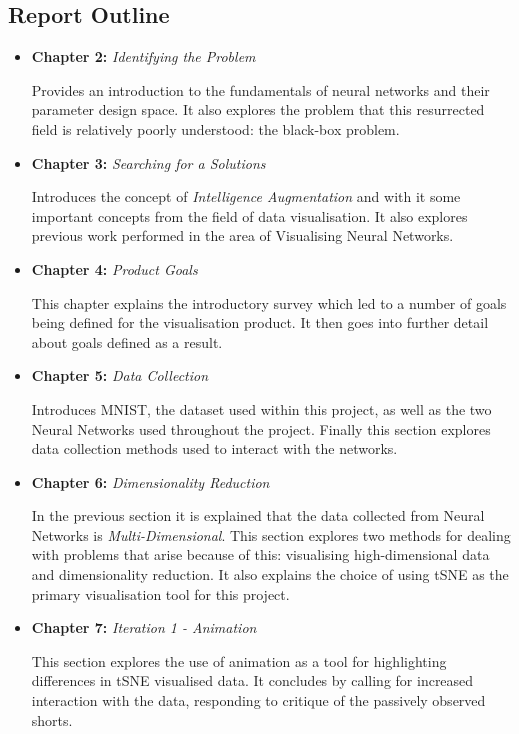 \documentclass[a4paper,11pt,titlepage]{article}
\begin{document}
	\subsection{Report Outline}
	\begin{itemize}
	\item \textbf{Chapter 2:} \textit{Identifying the Problem} 
	\par 
	Provides an introduction to the fundamentals of neural networks and their parameter design space. It also explores the problem that this resurrected field is relatively poorly understood: the black-box problem.
	\par
	\item \textbf{Chapter 3:} \textit{Searching for a Solutions}
	\par 
	Introduces the concept of \textit{Intelligence Augmentation} and with it some important concepts from the field of data visualisation. It also explores previous work performed in the area of Visualising Neural Networks.
	\par
	\item \textbf{Chapter 4:} \textit{Product Goals}
	\par 
	This chapter explains the introductory survey which led to a number of goals being defined for the visualisation product. It then goes into further detail about goals defined as a result. 
	\par
	\item \textbf{Chapter 5:} \textit{Data Collection}
	\par 
	Introduces MNIST, the dataset used within this project, as well as the two Neural Networks used throughout the project. Finally this section explores data collection methods used to interact with the networks.
	\par
	\item \textbf{Chapter 6:} \textit{Dimensionality Reduction}
	\par 
	In the previous section it is explained that the data collected from Neural Networks is \textit{Multi-Dimensional}. This section explores two methods for dealing with problems that arise because of this: visualising high-dimensional data and dimensionality reduction. It also explains the choice of using tSNE as the primary visualisation tool for this project.
	\par	
	\item \textbf{Chapter 7:} \textit{Iteration 1 - Animation}
	\par 
	This section explores the use of animation as a tool for highlighting differences in tSNE visualised data. It concludes by calling for increased interaction with the data, responding to critique of the passively observed shorts.

\end{itemize}
\end{document}
